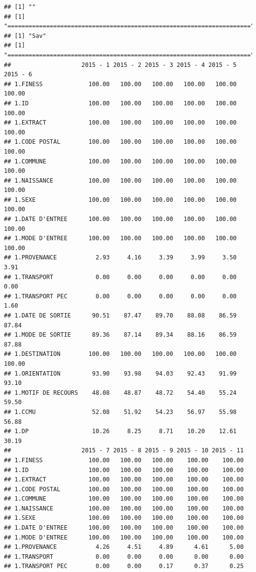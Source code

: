 \documentclass[]{article}
\begin{document}
\begin{verbatim}
## [1] ""
## [1] "====================================================================="
## [1] "Sav"
## [1] "====================================================================="
##                    2015 - 1 2015 - 2 2015 - 3 2015 - 4 2015 - 5 2015 - 6
## 1.FINESS             100.00   100.00   100.00   100.00   100.00   100.00
## 1.ID                 100.00   100.00   100.00   100.00   100.00   100.00
## 1.EXTRACT            100.00   100.00   100.00   100.00   100.00   100.00
## 1.CODE POSTAL        100.00   100.00   100.00   100.00   100.00   100.00
## 1.COMMUNE            100.00   100.00   100.00   100.00   100.00   100.00
## 1.NAISSANCE          100.00   100.00   100.00   100.00   100.00   100.00
## 1.SEXE               100.00   100.00   100.00   100.00   100.00   100.00
## 1.DATE D'ENTREE      100.00   100.00   100.00   100.00   100.00   100.00
## 1.MODE D'ENTREE      100.00   100.00   100.00   100.00   100.00   100.00
## 1.PROVENANCE           2.93     4.16     3.39     3.99     3.50     3.91
## 1.TRANSPORT            0.00     0.00     0.00     0.00     0.00     0.00
## 1.TRANSPORT PEC        0.00     0.00     0.00     0.00     0.00     1.60
## 1.DATE DE SORTIE      90.51    87.47    89.70    88.08    86.59    87.84
## 1.MODE DE SORTIE      89.36    87.14    89.34    88.16    86.59    87.88
## 1.DESTINATION        100.00   100.00   100.00   100.00   100.00   100.00
## 1.ORIENTATION         93.90    93.98    94.03    92.43    91.99    93.10
## 1.MOTIF DE RECOURS    48.08    48.87    48.72    54.40    55.24    59.50
## 1.CCMU                52.08    51.92    54.23    56.97    55.98    56.88
## 1.DP                  10.26     8.25     8.71    10.20    12.61    30.19
##                    2015 - 7 2015 - 8 2015 - 9 2015 - 10 2015 - 11
## 1.FINESS             100.00   100.00   100.00    100.00    100.00
## 1.ID                 100.00   100.00   100.00    100.00    100.00
## 1.EXTRACT            100.00   100.00   100.00    100.00    100.00
## 1.CODE POSTAL        100.00   100.00   100.00    100.00    100.00
## 1.COMMUNE            100.00   100.00   100.00    100.00    100.00
## 1.NAISSANCE          100.00   100.00   100.00    100.00    100.00
## 1.SEXE               100.00   100.00   100.00    100.00    100.00
## 1.DATE D'ENTREE      100.00   100.00   100.00    100.00    100.00
## 1.MODE D'ENTREE      100.00   100.00   100.00    100.00    100.00
## 1.PROVENANCE           4.26     4.51     4.89      4.61      5.00
## 1.TRANSPORT            0.00     0.00     0.00      0.00      0.00
## 1.TRANSPORT PEC        0.00     0.00     0.17      0.37      0.25

\end{verbatim}
\end{document}
